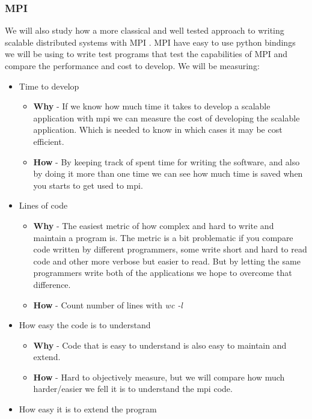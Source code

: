 \documentclass{article}
\begin{document}
\subsubsection{MPI}
We will also study how a more classical and well tested approach to writing
scalable distributed systems with MPI \cite{gropp1996high}. MPI have easy
to use python bindings \cite{miller2002pympi} \cite{millerparallel} we will be
using to write test programs that test the capabilities of MPI and compare the
performance and cost to develop.
We will be measuring:
\begin{itemize}
\item Time to develop
\begin{itemize}
\item{ \textbf{Why} - If we know how much time it takes to develop a scalable application with
mpi we can measure the cost of developing the scalable application. Which is needed to
know in which cases it may be cost efficient.}
\item{ \textbf{How} - By keeping track of spent time for writing the software, 
and also by doing it more than one time we can see how much time is saved
when you starts to get used to mpi.}
\end{itemize}
\item Lines of code
\begin{itemize}
\item{ \textbf{Why} - The easiest metric of how complex and hard to write and
 maintain a program is. The metric is a bit problematic if you compare
 code written by different programmers, some write short and hard to read
 code and other more verbose but easier to read. But by letting the same
 programmers write both of the applications we hope to overcome that 
 difference.}
\item{ \textbf{How} - Count number of lines with \emph{wc -l}}
\end{itemize}
\item How easy the code is to understand
\begin{itemize}
\item{ \textbf{Why} - Code that is easy to understand is also easy to maintain and extend. }
\item{ \textbf{How} - Hard to objectively measure, but we will compare how much harder/easier we 
 fell it is to understand the mpi code. }
\end{itemize}
\item How easy it is to extend the program
\begin{itemize}

\end{itemize}
\end{itemize}
\end{document}
